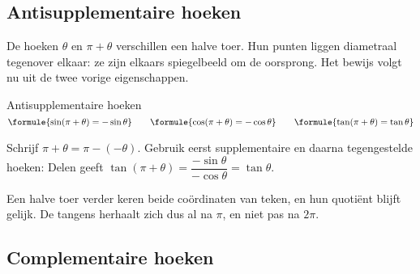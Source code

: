 \subsection{Antisupplementaire hoeken}

De hoeken $\theta$ en $\pi + \theta$ verschillen een halve toer. Hun punten liggen diametraal tegenover elkaar: ze zijn elkaars spiegelbeeld om de oorsprong. Het bewijs volgt nu uit de twee vorige eigenschappen.

\begin{theorie}
\begin{stelling}{Antisupplementaire hoeken}
\qquad $\formule{\sin(\pi + \theta) = -\sin\theta} \qquad \formule{\cos(\pi + \theta) = -\cos\theta} \qquad \formule{\tan(\pi + \theta) = \tan\theta}$
\end{stelling}
\begin{bewijs}
Schrijf $\pi + \theta = \pi - (-\theta)$. Gebruik eerst supplementaire en daarna tegengestelde hoeken:
\bewijsregel{\sin(\pi + \theta) = \sin\bigl(\pi - (-\theta)\bigr) = \sin(-\theta) = -\sin\theta}
\bewijsregel{\cos(\pi + \theta) = \cos\bigl(\pi - (-\theta)\bigr) = -\cos(-\theta) = -\cos\theta}
Delen geeft $\tan(\pi + \theta) = \dfrac{-\sin\theta}{-\cos\theta} = \tan\theta$.
\end{bewijs}
\end{theorie}

Een halve toer verder keren beide coördinaten van teken, en hun quotiënt blijft gelijk. De tangens herhaalt zich dus al na $\pi$, en niet pas na $2\pi$.


\begin{oefeningen}
\end{oefeningen}

\subsection{Complementaire hoeken}


